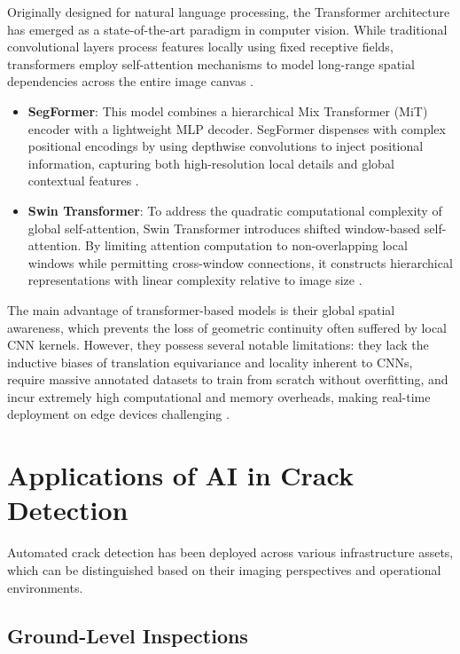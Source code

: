 \hs Originally designed for natural language processing, the Transformer architecture has emerged as a state-of-the-art paradigm in computer vision. While traditional convolutional layers process features locally using fixed receptive fields, transformers employ self-attention mechanisms to model long-range spatial dependencies across the entire image canvas \cite{sohaib-2024,zhang-2024c,zhang-2024a}.
\begin{itemize}
    \item \textbf{SegFormer}: This model combines a hierarchical Mix Transformer (MiT) encoder with a lightweight MLP decoder. SegFormer dispenses with complex positional encodings by using depthwise convolutions to inject positional information, capturing both high-resolution local details and global contextual features \cite{sohaib-2024}.
    \item \textbf{Swin Transformer}: To address the quadratic computational complexity of global self-attention, Swin Transformer introduces shifted window-based self-attention. By limiting attention computation to non-overlapping local windows while permitting cross-window connections, it constructs hierarchical representations with linear complexity relative to image size \cite{zhang-2024a,sohaib-2024,zhang-2024a}.
\end{itemize}

\hs The main advantage of transformer-based models is their global spatial awareness, which prevents the loss of geometric continuity often suffered by local CNN kernels. However, they possess several notable limitations: they lack the inductive biases of translation equivariance and locality inherent to CNNs, require massive annotated datasets to train from scratch without overfitting, and incur extremely high computational and memory overheads, making real-time deployment on edge devices challenging \cite{sohaib-2024,zhang-2024c}.

\section{Applications of AI in Crack Detection}

\hs Automated crack detection has been deployed across various infrastructure assets, which can be distinguished based on their imaging perspectives and operational environments.

\subsection{Ground-Level Inspections}

